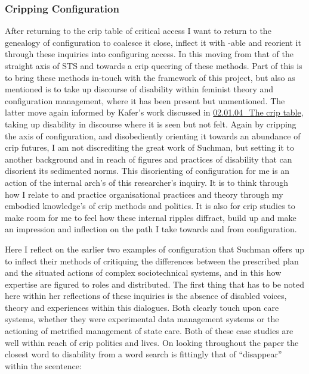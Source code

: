 \hypertarget{cripping-configuration}{%
\subsubsection{Cripping Configuration}\label{cripping-configuration}}

After returning to the crip table of critical access I want to return to
the genealogy of configuration to coalesce it close, inflect it with
-able and reorient it through these inquiries into configuring access.
In this moving from that of the straight axis of STS and towards a crip
queering of these methods. Part of this is to bring these methods
in-touch with the framework of this project, but also as mentioned is to
take up discourse of disability within feminist theory and configuration
management, where it has been present but unmentioned. The latter move
again informed by Kafer's work discussed in
\href{../02_Crip-Tic\%20of\%20vignettes/02.01.04_The\%20crip\%20table.md}{02.01.04\_The
crip table}, taking up disability in discourse where it is seen but not
felt. Again by cripping the axis of configuration, and disobediently
orienting it towards an abundance of crip futures, I am not discrediting
the great work of Suchman, but setting it to another background and in
reach of figures and practices of disability that can disorient its
sedimented norms. This disorienting of configuration for me is an action
of the internal arch's of this researcher's inquiry. It is to think
through how I relate to and practice organisational practices and theory
through my embodied knowledge's of crip methods and politics. It is also
for crip studies to make room for me to feel how these internal ripples
diffract, build up and make an impression and inflection on the path I
take towards and from configuration.

Here I reflect on the earlier two examples of configuration that Suchman
offers up to inflect their methods of critiquing the differences between
the prescribed plan and the situated actions of complex sociotechnical
systems, and in this how expertise are figured to roles and distributed.
The first thing that has to be noted here within her reflections of
these inquiries is the absence of disabled voices, theory and
experiences within this dialogues. Both clearly touch upon care systems,
whether they were experimental data management systems or the actioning
of metrified management of state care. Both of these case studies are
well within reach of crip politics and lives. On looking throughout the
paper the closest word to disability from a word search is fittingly
that of ``disappear'' within the scentence:

